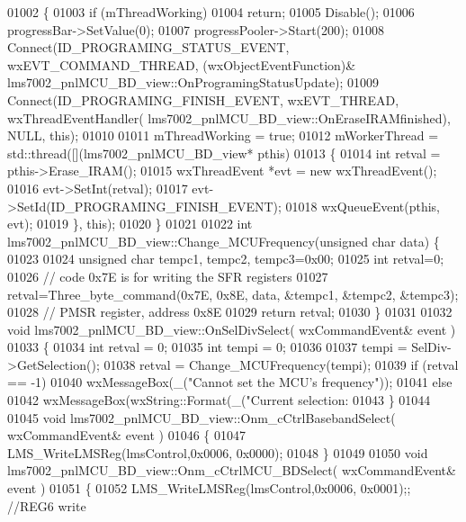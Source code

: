\begin{DoxyCode}
{{{{{{{{{{{{{{{{{01002 \{
01003     \textcolor{keywordflow}{if} (mThreadWorking)
01004         \textcolor{keywordflow}{return};
01005     Disable();
01006     progressBar->SetValue(0);
01007     progressPooler->Start(200);
01008     Connect(ID_PROGRAMING_STATUS_EVENT, wxEVT\_COMMAND\_THREAD, (wxObjectEventFunction)&
      lms7002_pnlMCU_BD_view::OnProgramingStatusUpdate);
01009     Connect(ID_PROGRAMING_FINISH_EVENT, wxEVT\_THREAD, wxThreadEventHandler(
      lms7002_pnlMCU_BD_view::OnEraseIRAMfinished), NULL, \textcolor{keyword}{this});
01010 
01011     mThreadWorking = \textcolor{keyword}{true};
01012     mWorkerThread = std::thread([](lms7002_pnlMCU_BD_view* pthis)
01013     \{
01014         \textcolor{keywordtype}{int} retval = pthis->Erase_IRAM();
01015         wxThreadEvent *evt = \textcolor{keyword}{new} wxThreadEvent();
01016         evt->SetInt(retval);
01017         evt->SetId(ID_PROGRAMING_FINISH_EVENT);
01018         wxQueueEvent(pthis, evt);
01019     \}, \textcolor{keyword}{this});
01020 \}
01021 
01022 \textcolor{keywordtype}{int} lms7002_pnlMCU_BD_view::Change_MCUFrequency(\textcolor{keywordtype}{unsigned} \textcolor{keywordtype}{char} data) \{
01023 
01024     \textcolor{keywordtype}{unsigned} \textcolor{keywordtype}{char} tempc1, tempc2, tempc3=0x00;
01025     \textcolor{keywordtype}{int} retval=0;
01026     \textcolor{comment}{// code 0x7E is for writing the SFR registers}
01027     retval=Three_byte_command(0x7E, 0x8E, data, &tempc1, &tempc2, &tempc3);
01028     \textcolor{comment}{// PMSR register, address 0x8E}
01029     \textcolor{keywordflow}{return} retval;
01030 \}
01031 
01032 \textcolor{keywordtype}{void} lms7002_pnlMCU_BD_view::OnSelDivSelect( wxCommandEvent& event )
01033 \{
01034     \textcolor{keywordtype}{int} retval = 0;
01035     \textcolor{keywordtype}{int} tempi = 0;
01036 
01037     tempi = SelDiv->GetSelection();
01038     retval = Change_MCUFrequency(tempi);
01039     \textcolor{keywordflow}{if} (retval == -1)
01040         wxMessageBox(\_(\textcolor{stringliteral}{"Cannot set the MCU's frequency"}));
01041     \textcolor{keywordflow}{else}
01042         wxMessageBox(wxString::Format(\_(\textcolor{stringliteral}{"Current selection: %
01043 \}
01044 
01045 \textcolor{keywordtype}{void} lms7002_pnlMCU_BD_view::Onm_cCtrlBasebandSelect( wxCommandEvent& event )
01046 \{
01047     LMS_WriteLMSReg(lmsControl,0x0006, 0x0000);
01048 \}
01049 
01050 \textcolor{keywordtype}{void} lms7002_pnlMCU_BD_view::Onm_cCtrlMCU_BDSelect( wxCommandEvent& event )
01051 \{
01052     LMS_WriteLMSReg(lmsControl,0x0006, 0x0001);; \textcolor{comment}{//REG6 write}
}}}}}}}}}}}}}}}}}}
\end{DoxyCode}
